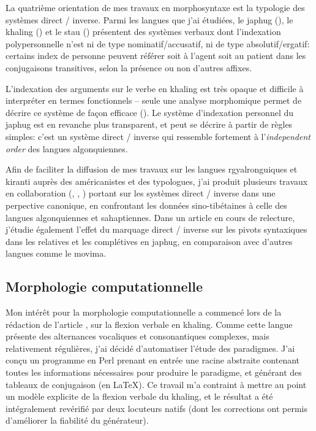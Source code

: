 \documentclass[oldfontcommands,oneside,a4paper,11pt]{article}
\begin{document}
 La quatrième orientation de mes travaux en morphosyntaxe est la typologie des systèmes direct / inverse. Parmi les langues que j'ai étudiées, le japhug (\citealt{jacques10inverse}), le khaling (\citealt{jacques12khaling}) et le stau  (\citealt{jacques14rtau}) présentent des systèmes verbaux dont l'indexation polypersonnelle n'est ni de type nominatif/accusatif, ni de type absolutif/ergatif: certains index de personne  peuvent référer soit à l'agent soit au patient dans les conjugaisons transitives, selon la présence ou non d'autres affixes.
 
 L'indexation des arguments sur le verbe en khaling est très opaque et difficile à interpréter en termes fonctionnels -- seule une analyse morphomique permet de décrire ce système de façon efficace (\citealt{walther14compactness}). Le système d'indexation personnel du  japhug est en revanche plus transparent, et peut se décrire à partir de règles simples: c'est un système direct / inverse qui ressemble fortement à l'\textit{independent order} des langues algonquiennes.  
 
Afin de faciliter la diffusion de mes travaux sur les langues rgyalronguiques et kiranti auprès des américanistes et des typologues, j'ai produit  plusieurs travaux en collaboration (\citealt{jacques14inverse}, \citealt{jacques15directionality},   \citealt{walther14inv.canon}) portant sur les systèmes direct / inverse dans une perpective canonique, en confrontant les données sino-tibétaines à celle des langues  algonquiennes et sahaptiennes.   Dans un article en cours de relecture, j'étudie également l'effet du marquage direct / inverse sur les pivots syntaxiques dans les relatives et les complétives en japhug, en comparaison avec d'autres langues comme le movima.
  
\subsection{Morphologie computationnelle}  \label{sec:morpho}
Mon intérêt pour la morphologie computationnelle a commencé lors de la rédaction de l'article \citet{jacques12khaling}, sur la flexion verbale en khaling. Comme cette langue présente des alternances vocaliques et consonantiques complexes, mais relativement régulières, j'ai décidé d'automatiser l'étude des paradigmes. J'ai conçu un programme en Perl prenant en entrée une racine abstraite contenant toutes les informations nécessaires pour produire le paradigme, et générant des tableaux de conjugaison (en  \LaTeX{}). Ce travail m'a contraint à mettre au point un modèle explicite de la flexion verbale du khaling, et le résultat a été intégralement revérifié par deux locuteurs natifs (dont les corrections ont permis d'améliorer la fiabilité du générateur).
\end{document}
